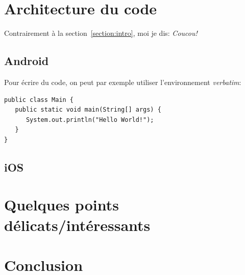 \documentclass{article}
\begin{document}
\section{Architecture du code}
Contrairement à la section~\ref{section:intro},
moi je dis: \textit{Coucou!}

\subsection{Android} %
Pour écrire du code, on peut par exemple utiliser l'environnement
\textit{verbatim}:
\begin{verbatim}
public class Main {
   public static void main(String[] args) {
      System.out.println("Hello World!");
   }
}
\end{verbatim}

\subsection{iOS} %


\section{Quelques points délicats/intéressants}


\section{Conclusion}




\end{document}

